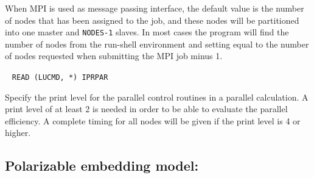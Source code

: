 \begin{description}
When MPI is used as message passing interface, the
default value is the number of nodes that has been assigned to the
job, and these nodes will be partitioned into one master and
\verb|NODES-1| slaves. In most cases the program will
find the number of nodes from the run-shell environment and setting
equal to the number of nodes requested when submitting the MPI job minus 1.

%
%
\item[\Key{PRINT}]\verb| |\newline
\verb|READ (LUCMD, *) IPRPAR|

Specify the print level for the parallel control routines in a parallel calculation.
A print level of at least 2 is needed in order to be able to evaluate the
parallel efficiency. A complete
timing for all nodes will be given if the print level is 4 or higher.
\end{description}

\subsection{Polarizable embedding model: }
\label{subsec:peqm} 


